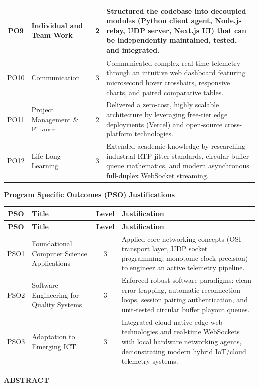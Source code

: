 \documentclass[12pt, a4paper]{report}
\begin{document}
\begin{xltabular}{\textwidth}{|c|p{2.8cm}|c|L|}
\hline
PO9 & Individual and Team Work & 2 & Structured the codebase into decoupled modules (Python client agent, Node.js relay, UDP server, Next.js UI) that can be independently maintained, tested, and integrated. \\
\hline
PO10 & Communication & 3 & Communicated complex real-time telemetry through an intuitive web dashboard featuring microsecond hover crosshairs, responsive charts, and paired comparative tables. \\
\hline
PO11 & Project Management \& Finance & 2 & Delivered a zero-cost, highly scalable architecture by leveraging free-tier edge deployments (Vercel) and open-source cross-platform technologies. \\
\hline
PO12 & Life-Long Learning & 3 & Extended academic knowledge by researching industrial RTP jitter standards, circular buffer queue mathematics, and modern asynchronous full-duplex WebSocket streaming. \\
\hline
\end{xltabular}

\vspace{0.3cm}
\noindent\textbf{\large Program Specific Outcomes (PSO) Justifications}
\vspace{0.2cm}

\begin{xltabular}{\textwidth}{|c|p{3.2cm}|c|L|}
\hline
\textbf{PSO} & \textbf{Title} & \textbf{Level} & \textbf{Justification} \\
\hline
\endfirsthead
\hline
\textbf{PSO} & \textbf{Title} & \textbf{Level} & \textbf{Justification} \\
\hline
\endhead
PSO1 & Foundational Computer Science Applications & 3 & Applied core networking concepts (OSI transport layer, UDP socket programming, monotonic clock precision) to engineer an active telemetry pipeline. \\
\hline
PSO2 & Software Engineering for Quality Systems & 3 & Enforced robust software paradigms: clean error trapping, automatic reconnection loops, session pairing authentication, and unit-tested circular buffer playout queues. \\
\hline
PSO3 & Adaptation to Emerging ICT & 3 & Integrated cloud-native edge web technologies and real-time WebSockets with local hardware networking agents, demonstrating modern hybrid IoT/cloud telemetry systems. \\
\hline
\end{xltabular}

\vspace{0.5cm}
\begin{center}
    {\Large\bfseries ABSTRACT\par}
\end{center}
\vspace{0.2cm}
\end{document}
